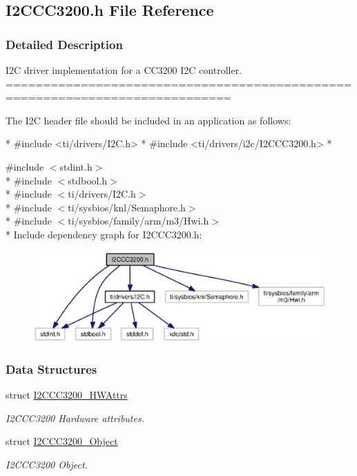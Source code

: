 \subsection{I2\-C\-C\-C3200.\-h File Reference}
\label{_i2_c_c_c3200_8h}


\subsubsection{Detailed Description}
I2\-C driver implementation for a C\-C3200 I2\-C controller. ============================================================================

The I2\-C header file should be included in an application as follows\-: 
\begin{DoxyCode}
*  #include <ti/drivers/I2C.h>
*  #include <ti/drivers/i2c/I2CCC3200.h>
*  
\end{DoxyCode}
 

{\ttfamily \#include $<$stdint.\-h$>$}\\*
{\ttfamily \#include $<$stdbool.\-h$>$}\\*
{\ttfamily \#include $<$ti/drivers/\-I2\-C.\-h$>$}\\*
{\ttfamily \#include $<$ti/sysbios/knl/\-Semaphore.\-h$>$}\\*
{\ttfamily \#include $<$ti/sysbios/family/arm/m3/\-Hwi.\-h$>$}\\*
Include dependency graph for I2\-C\-C\-C3200.\-h\-:
\nopagebreak
\begin{figure}[H]
\begin{center}
\leavevmode
\includegraphics[width=350pt]{_i2_c_c_c3200_8h__incl}
\end{center}
\end{figure}
\subsubsection*{Data Structures}
\begin{DoxyCompactItemize}
\item 
struct \hyperlink{struct_i2_c_c_c3200___h_w_attrs}{I2\-C\-C\-C3200\-\_\-\-H\-W\-Attrs}
\begin{DoxyCompactList}\small\item\em I2\-C\-C\-C3200 Hardware attributes. \end{DoxyCompactList}\item 
struct \hyperlink{struct_i2_c_c_c3200___object}{I2\-C\-C\-C3200\-\_\-\-Object}
\begin{DoxyCompactList}\small\item\em I2\-C\-C\-C3200 Object. \end{DoxyCompactList}\end{DoxyCompactItemize}
